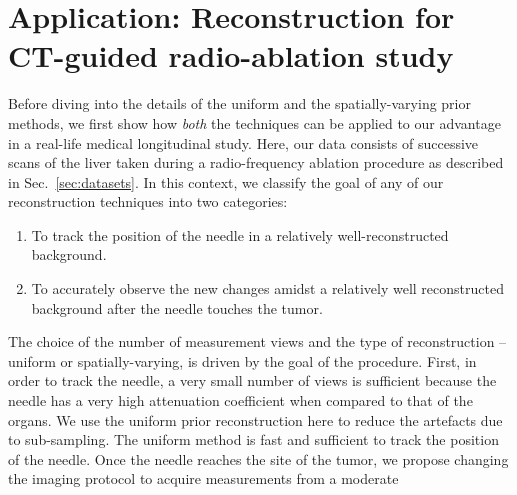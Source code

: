 \documentclass[journal]{IEEEtran}
\begin{document}
\section{Application: Reconstruction for CT-guided radio-ablation study}
\label{sec:tmh}
Before diving into the details of the uniform and the
spatially-varying prior methods, we first show how \textit{both} the
techniques can be applied to our advantage in a real-life medical
longitudinal study. Here, our data consists of successive scans of the liver taken
during a radio-frequency ablation procedure as described in Sec.~\ref{sec:datasets}. In this context, we classify the goal of any of our
reconstruction techniques into two categories: 
\begin{enumerate}
\item To track the position of the needle in a relatively well-reconstructed background.%
\item To accurately observe the new changes amidst a relatively well reconstructed background after the needle touches the tumor.%
\end{enumerate} 
The choice of the number of
measurement views and the type of reconstruction -- uniform or
spatially-varying, is driven by the goal of the procedure. First, in
order to track the needle, a very small number of views is sufficient
because the needle has a very high attenuation coefficient when
compared to that of the organs. We use the uniform prior
reconstruction here to reduce the artefacts due to sub-sampling. The
uniform method is fast and sufficient to track the position of the
needle.  Once the needle reaches the site of the tumor, we propose
changing the imaging protocol to acquire measurements from a moderate
\end{document}
